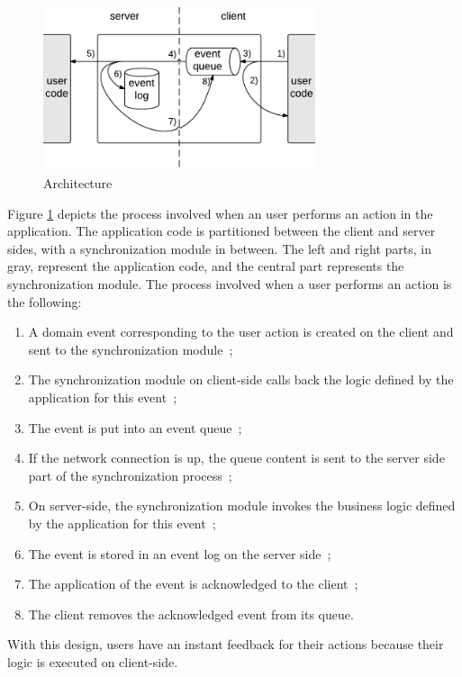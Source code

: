 \documentclass{llncs}
\begin{document}
\begin{figure}
\centering
\includegraphics[width=8cm]{arch.pdf}
\caption{Architecture}
\label{fig-arch}
\end{figure}

Figure \ref{fig-arch} depicts the process involved when an user performs an action in the application. The application code is partitioned between the client and server sides, with a synchronization module in between. The left and right parts, in gray, represent the application code, and the central part represents the synchronization module. The process involved when a user performs an action is the following:

\begin{enumerate}
 \item A domain event corresponding to the user action is created on the client and sent to the synchronization module~;
 \item The synchronization module on client-side calls back the logic defined by the application for this event~;
 \item The event is put into an event queue~;
 \item If the network connection is up, the queue content is sent to the server side part of the synchronization process~;
 \item On server-side, the synchronization module invokes the business logic defined by the application for this event~;
 \item The event is stored in an event log on the server side~;
 \item The application of the event is acknowledged to the client~;
 \item The client removes the acknowledged event from its queue.
\end{enumerate}

With this design, users have an instant feedback for their actions because their logic is executed on client-side.

\end{document}
